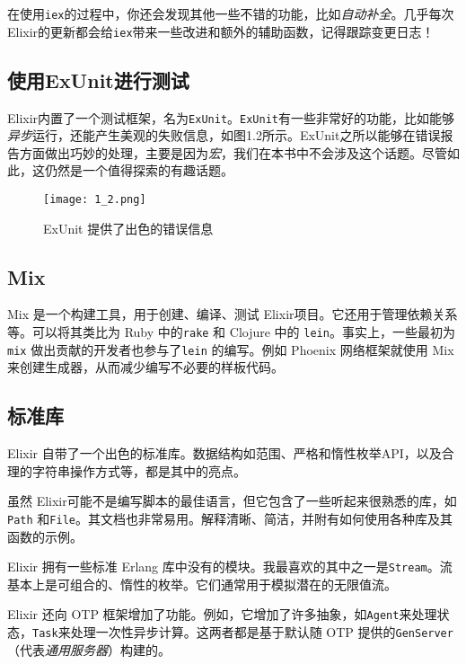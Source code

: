 在使用\texttt{iex}的过程中，你还会发现其他一些不错的功能，比如\emph{自动补全}。几乎每次Elixir的更新都会给\texttt{iex}带来一些改进和额外的辅助函数，记得跟踪变更日志！

\subsection{使用ExUnit进行测试}

Elixir内置了一个测试框架，名为\texttt{ExUnit}。\texttt{ExUnit}有一些非常好的功能，比如能够\emph{异步}运行，还能产生美观的失败信息，如图1.2所示。ExUnit之所以能够在错误报告方面做出巧妙的处理，主要是因为\emph{宏}，我们在本书中不会涉及这个话题。尽管如此，这仍然是一个值得探索的有趣话题。

\begin{figure}[htbp]
  \centering
  \texttt{[image: 1\_2.png]}
  \caption{ExUnit 提供了出色的错误信息}
  \label{fig:1_2}
\end{figure}

\subsection{Mix}\label{mix}

Mix 是一个构建工具，用于创建、编译、测试 Elixir项目。它还用于管理依赖关系等。可以将其类比为 Ruby 中的\texttt{rake} 和 Clojure 中的
\texttt{lein}。事实上，一些最初为\texttt{mix} 做出贡献的开发者也参与了\texttt{lein} 的编写。例如 Phoenix 网络框架就使用 Mix来创建生成器，从而减少编写不必要的样板代码。


\subsection{标准库}

Elixir 自带了一个出色的标准库。数据结构如范围、严格和惰性枚举API，以及合理的字符串操作方式等，都是其中的亮点。

虽然 Elixir可能不是编写脚本的最佳语言，但它包含了一些听起来很熟悉的库，如\texttt{Path} 和\texttt{File}。其文档也非常易用。解释清晰、简洁，并附有如何使用各种库及其函数的示例。

Elixir 拥有一些标准 Erlang 库中没有的模块。我最喜欢的其中之一是\texttt{Stream}。流基本上是可组合的、惰性的枚举。它们通常用于模拟潜在的无限值流。

Elixir 还向 OTP 框架增加了功能。例如，它增加了许多抽象，如\texttt{Agent}来处理状态，\texttt{Task}来处理一次性异步计算。这两者都是基于默认随 OTP 提供的\texttt{GenServer}（代表\emph{通用服务器}）构建的。


